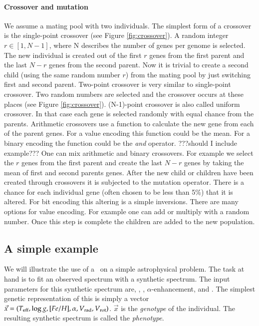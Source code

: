 \paragraph{Crossover and mutation}
We assume a mating pool with two individuals. The simplest form of a crossover is the single-point crossover (see Figure \ref{fig:crossover}). A random integer $r \in [1,N-1]$, where N describes the number of genes per genome is selected. The new individual is created out of the first $r$ genes from the first parent and the last $N-r$ genes from the second parent. Now it is trivial to create a second child (using the same random number $r$) from the mating pool by just switching first and second parent. 
Two-point crossover is very similar to single-point crossover. Two random numbers are selected and the crossover occurs at these places (see Figure \ref{fig:crossover}). (N-1)-point crossover is also called uniform crossover. In that case each gene is selected randomly with equal chance from the parents.
Arithmetic crossovers use a function to calculate the new gene from each of the parent genes. For a value encoding this function could be the mean. For a binary encoding the function could be the \textit{and} operator. ???should I include example???
One can mix arithmetic and binary crossovers. For example we select the $r$ genes from the first parent and create the last $N-r$ genes by taking the mean of first and second parents genes. 
After the new child or children have been created through crossovers it is subjected to the mutation operator. There is a chance for each individual gene (often chosen to be less than 5\%) that it is altered. For bit encoding this altering is a simple inversions. There are many options for value encoding. For example one can add or multiply with a random number. 
Once this step is complete the children are added to the new population.

\subsection{A simple example}
We will illustrate the use of a \ga\ on a simple astrophysical problem. The task at hand is to fit an observed spectrum with a synthetic spectrum. The input parameters for this synthetic spectrum are\teff, \logg, \feh, $\alpha$-enhancement, \vrad and \vrot. The simplest genetic representation of this is simply a vector $\vec{x} = (T_{\rm eff}, \log{g}, [Fe/H], \alpha, \hbox{$V_{\textrm{rad}}$}, \hbox{$V_{\textrm{rot}}$})$. $\vec{x}$ is the \textit{genotype} of the individual. The resulting synthetic spectrum is called the \textit{phenotype}. 


